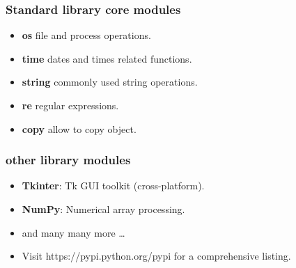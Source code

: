 \begin{frame}[fragile]\frametitle{Standard library core modules}
  \begin{itemize}
  \item \textbf{os} file and process operations.
  \item \textbf{time} dates and times related functions.
  \item \textbf{string} commonly used string operations.
  \item \textbf{re} regular expressions.
  \item \textbf{copy} allow to copy object.
  \end{itemize}
\end{frame}

\begin{frame}[fragile]\frametitle{other library modules}
  \begin{itemize}
  \item \textbf{Tkinter}: Tk GUI toolkit (cross-platform).
     \item \textbf{NumPy}: Numerical array processing.
     \item and many many more \ldots
     \item Visit https://pypi.python.org/pypi for a comprehensive listing.
   \end{itemize}
\end{frame}
